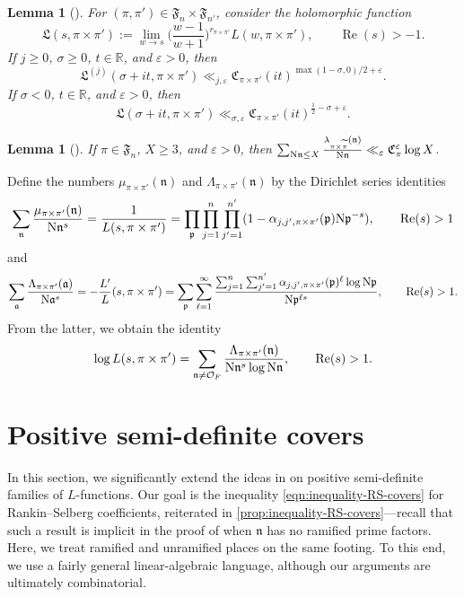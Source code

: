 \documentclass[11pt]{amsart}
\newtheorem{lemma}[theorem]{Lemma}
\theoremstyle{remark}
\numberwithin{equation}{section}
\newcommand{\ka}{\mathfrak{a}}
\newcommand{\kp}{\mathfrak{p}}
\newcommand{\n}{\mathfrak{n}}
\newcommand{\kn}{\mathfrak{n}}
\newcommand{\N}{\textnormal{N}}
\newcommand{\R}{\mathbb{R}}
\renewcommand{\Re}{\textnormal{Re}}
\newcommand{\re}{\mathop{\mathrm{Re}}}
\renewcommand{\Re}{\mathop{\mathrm{Re}}}
\renewcommand{\epsilon}{\varepsilon}
\begin{document}
\begin{lemma}[{\cite[Lemma 3.2]{HarcosThorner}}]
\label{lem:Li1}
For $(\pi,\pi')\in\mathfrak{F}_n\times\mathfrak{F}_{n'}$, consider the holomorphic function
\[
\mathfrak{L}(s,\pi\times\pi') := \lim_{w\to s}\Big(\frac{w-1}{w+1}\Big)^{r_{\pi\times\pi'}}L(w,\pi\times\pi'),\qquad\Re(s)>-1.
\]
If $j\geq 0$, $\sigma\geq 0$, $t\in\R$, and $\epsilon>0$, then
\begin{equation}
\label{eqn:Lbound1}
\mathfrak{L}^{(j)}(\sigma+it,\pi\times\pi')\ll_{j,\epsilon}\mathfrak{C}_{\pi\times\pi'}(it)^{\max(1-\sigma,0)/2+\epsilon}.
\end{equation}
If $\sigma< 0$, $t\in\R$, and $\epsilon>0$, then
\begin{equation}
\label{eqn:Lbound2}
\mathfrak{L}(\sigma+it,\pi\times\pi')\ll_{\sigma,\epsilon}\mathfrak{C}_{\pi\times\pi'}(it)^{\frac{1}{2}-\sigma+\epsilon}.
\end{equation}
\end{lemma}


\begin{lemma}[{\cite[Lemma 3.1]{humphries2024zeros}}]
\label{lem:mertens}
	If $\pi\in\mathfrak{F}_n$, $X\geq 3$, and $\epsilon>0$, then $\sum_{\N\kn\leq X}\frac{\lambda_{\pi\times\widetilde{\pi}}(\kn)}{\N\kn}\ll_{\epsilon} \mathfrak{C}_{\pi}^{\epsilon}\log X$.
\end{lemma}


Define the numbers $\mu_{\pi\times\pi'}(\kn)$ and $\Lambda_{\pi\times\pi'}(\kn)$ by the Dirichlet series identities
\[
\sum_{\kn}\frac{\mu_{\pi\times\pi'}(\kn)}{\N\kn^s}=\frac{1}{L(s,\pi\times\pi')}=\prod_{\kp}\prod_{j=1}^n\prod_{j'=1}^{n'}(1-\alpha_{j,j',\pi\times\pi'}(\kp)\N\kp^{-s}),\qquad \re(s)>1
\]
and
\[
\sum_{\ka}\frac{\Lambda_{\pi\times\pi'}(\ka)}{\N\ka^s} = -\frac{L'}{L}(s,\pi\times\pi')  = \sum_{\kp}\sum_{\ell=1}^{\infty}\frac{\sum_{j=1}^n \sum_{j'=1}^{n'}\alpha_{j,j',\pi\times\pi'}(\kp)^{\ell}\log\N\kp}{\N\kp^{\ell s}},\qquad \re(s)>1.
\]
From the latter, we obtain the identity
\begin{align*}
\log L(s,\pi\times\pi') = \sum_{\kn\neq\mathcal{O}_F}\frac{\Lambda_{\pi\times\pi'}(\kn)}{\N\kn^s \log\N\kn},\qquad \re(s)>1.
\end{align*}


\section{Positive semi-definite covers} \label{sec:non-def-covers}

In this section, we significantly extend the ideas in \cite{lichtman2024density} on positive semi-definite families of $L$-functions. Our goal is the inequality \eqref{eqn:inequality-RS-covers} for Rankin--Selberg coefficients, reiterated in \cref{prop:inequality-RS-covers}---recall that such a result is implicit in the proof of \cite[Theorem 4.1]{humphries2024zeros} when $\n$ has no ramified prime factors.  Here, we treat ramified and unramified places on the same footing.  To this end, we use a fairly general linear-algebraic language, although our arguments are ultimately combinatorial.
\end{document}
